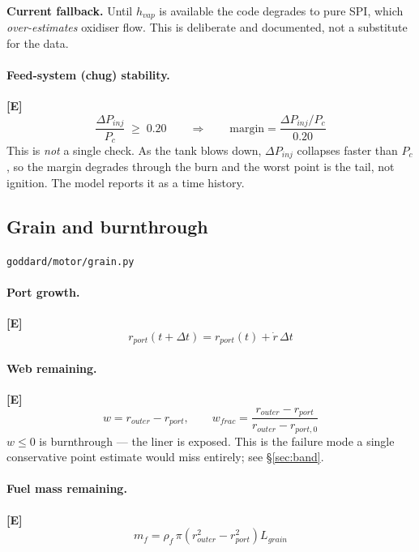 \documentclass[11pt,a4paper]{article}
\newcommand{\established}{\textcolor{okgreen}{\textbf{[E]}}\xspace}
\newcommand{\src}[1]{\hfill{\footnotesize\texttt{#1}}}
\begin{document}
\medskip
\noindent\textbf{Current fallback.} Until $h_{vap}$ is available the code
degrades to pure SPI, which \emph{over-estimates} oxidiser flow. This is
deliberate and documented, not a substitute for the data.

\paragraph{Feed-system (chug) stability.} \established
\begin{equation}
\frac{\Delta P_{inj}}{P_c} \;\geq\; 0.20
\qquad\Longrightarrow\qquad
\text{margin} = \frac{\Delta P_{inj}/P_c}{0.20}
\end{equation}
This is \emph{not} a single check. As the tank blows down, $\Delta P_{inj}$
collapses faster than $P_c$, so the margin degrades through the burn and the
worst point is the tail, not ignition. The model reports it as a time history.

\subsection{Grain and burnthrough}
\src{goddard/motor/grain.py}

\paragraph{Port growth.} \established
\begin{equation}
r_{port}(t + \Delta t) = r_{port}(t) + \dot r\,\Delta t
\end{equation}

\paragraph{Web remaining.} \established
\begin{equation}
w = r_{outer} - r_{port}, \qquad
w_{frac} = \frac{r_{outer} - r_{port}}{r_{outer} - r_{port,0}}
\end{equation}
$w \le 0$ is burnthrough --- the liner is exposed. This is the failure mode a
single conservative point estimate would miss entirely; see \S\ref{sec:band}.

\paragraph{Fuel mass remaining.} \established
\begin{equation}
m_f = \rho_f\,\pi\!\left(r_{outer}^2 - r_{port}^2\right) L_{grain}
\end{equation}
\end{document}
